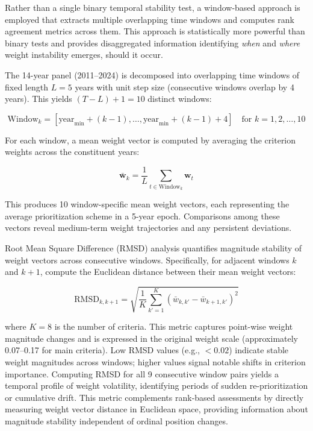 \documentclass[12pt,a4paper]{article}
\begin{document}
Rather than a single binary temporal stability test, a window-based approach is employed that extracts multiple overlapping time windows and computes rank agreement metrics across them. This approach is statistically more powerful than binary tests and provides disaggregated information identifying \textit{when} and \textit{where} weight instability emerges, should it occur.

The 14-year panel (2011--2024) is decomposed into overlapping time windows of fixed length $L = 5$ years with unit step size (consecutive windows overlap by 4 years). This yields $(T - L) + 1 = 10$ distinct windows:

\begin{equation}
\text{Window}_k = [\text{year}_{\min} + (k-1), \ldots, \text{year}_{\min} + (k-1) + 4] \quad \text{for } k = 1, 2, \ldots, 10
\end{equation}

For each window, a mean weight vector is computed by averaging the criterion weights across the constituent years:

\begin{equation}
\bar{\mathbf{w}}_k = \frac{1}{L} \sum_{t \in \text{Window}_k} \mathbf{w}_t
\end{equation}

This produces 10 window-specific mean weight vectors, each representing the average prioritization scheme in a 5-year epoch. Comparisons among these vectors reveal medium-term weight trajectories and any persistent deviations.

Root Mean Square Difference (RMSD) analysis quantifies magnitude stability of weight vectors across consecutive windows. Specifically, for adjacent windows $k$ and $k+1$, compute the Euclidean distance between their mean weight vectors:

\begin{equation}
\text{RMSD}_{k,k+1} = \sqrt{\frac{1}{K} \sum_{k'=1}^{K} (\bar{w}_{k,k'} - \bar{w}_{k+1,k'})^2}
\end{equation}

where $K = 8$ is the number of criteria. This metric captures point-wise weight magnitude changes and is expressed in the original weight scale (approximately 0.07--0.17 for main criteria). Low RMSD values (e.g., $< 0.02$) indicate stable weight magnitudes across windows; higher values signal notable shifts in criterion importance. Computing RMSD for all 9 consecutive window pairs yields a temporal profile of weight volatility, identifying periods of sudden re-prioritization or cumulative drift. This metric complements rank-based assessments by directly measuring weight vector distance in Euclidean space, providing information about magnitude stability independent of ordinal position changes.
\end{document}
